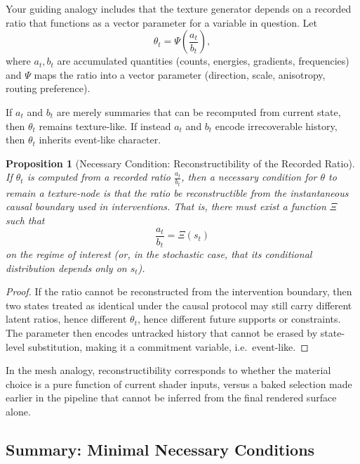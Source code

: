 \documentclass[11pt]{article}
\newtheorem{proposition}{Proposition}
\begin{document}
Your guiding analogy includes that the texture generator depends on a recorded
ratio that functions as a vector parameter for a variable in question. Let
\begin{equation}
\theta_t = \Psi\!\left(\frac{a_t}{b_t}\right),
\end{equation}
where $a_t,b_t$ are accumulated quantities (counts, energies, gradients,
frequencies) and $\Psi$ maps the ratio into a vector parameter (direction,
scale, anisotropy, routing preference).

If $a_t$ and $b_t$ are merely summaries that can be recomputed from current
state, then $\theta_t$ remains texture-like. If instead $a_t$ and $b_t$ encode
irrecoverable history, then $\theta_t$ inherits event-like character.

\begin{proposition}[Necessary Condition: Reconstructibility of the Recorded Ratio]
If $\theta_t$ is computed from a recorded ratio $\frac{a_t}{b_t}$, then a
necessary condition for $\theta$ to remain a texture-node is that the ratio be
reconstructible from the instantaneous causal boundary used in interventions.
That is, there must exist a function $\Xi$ such that
\begin{equation}
\frac{a_t}{b_t} = \Xi(s_t)
\end{equation}
on the regime of interest (or, in the stochastic case, that its conditional
distribution depends only on $s_t$).
\end{proposition}

\begin{proof}
If the ratio cannot be reconstructed from the intervention boundary, then two
states treated as identical under the causal protocol may still carry
different latent ratios, hence different $\theta_t$, hence different future
supports or constraints. The parameter then encodes untracked history that
cannot be erased by state-level substitution, making it a commitment variable,
i.e.\ event-like.
\end{proof}

In the mesh analogy, reconstructibility corresponds to whether the material
choice is a pure function of current shader inputs, versus a baked selection
made earlier in the pipeline that cannot be inferred from the final rendered
surface alone.

\subsection{Summary: Minimal Necessary Conditions}
\end{document}
